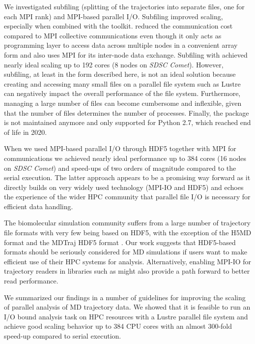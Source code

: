 We investigated subfiling (splitting of the trajectories into separate files, one for each MPI rank) and MPI-based parallel I/O.
Subfiling improved scaling, especially when combined with the  toolkit.
 reduced the communication cost compared to MPI collective communications even though it only acts as programming layer to access data across multiple nodes in a convenient array form and also uses MPI for its inter-node data exchange.
Subfiling with  achieved nearly ideal scaling up to 192 cores (8 nodes on \emph{SDSC Comet}).
However, subfiling, at least in the form described here, is not an ideal solution because creating and accessing many small files on a parallel file system such as Lustre can negatively impact the overall performance of the file system.
Furthermore, managing a large number of files can become cumbersome and inflexible, given that the number of files determines the number of processes.
Finally, the  package is not maintained anymore and only supported for Python 2.7, which reached end of life in 2020.

When we used MPI-based parallel I/O through HDF5 together with MPI for communications we achieved nearly ideal performance up to 384 cores (16 nodes on \emph{SDSC Comet}) and speed-ups of two orders of magnitude compared to the serial execution.
The latter approach appears to be a promising way forward as it directly builds on very widely used technology (MPI-IO and HDF5) and echoes the experience of the wider HPC community that parallel file I/O is necessary for efficient data handling.

The biomolecular simulation community suffers from a large number of trajectory file formats with very few being based on HDF5, with the exception of the H5MD format \cite{Buyl:2014aa} and the MDTraj HDF5 format \cite{McGibbon:2015aa}.
Our work suggests that HDF5-based formats should be seriously considered for MD simulations if users want to make efficient use of their HPC systems for analysis. 
Alternatively, enabling MPI-IO for trajectory readers in libraries such as  might also provide a path forward to better read performance.

We summarized our findings in a number of guidelines for improving the scaling of parallel analysis of MD trajectory data.
We showed that it is feasible to run an I/O bound analysis task on HPC resources with a Lustre parallel file system and achieve good scaling behavior up to 384 CPU cores with an almost 300-fold speed-up compared to serial execution.

